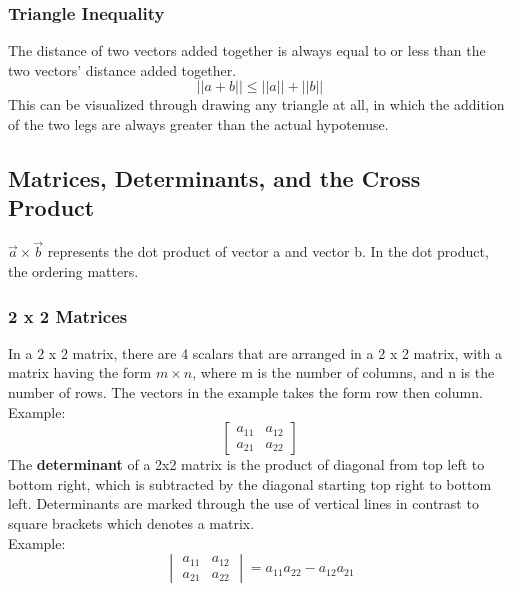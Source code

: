\documentclass{article}
\begin{document}
	\subsubsection{Triangle Inequality}
	The distance of two vectors added together is always equal to or less than the two vectors' distance added together.
	$$ ||a + b|| \leq ||a|| + ||b||$$
	This can be visualized through drawing any triangle at all, in which the addition of the two legs are always greater
	than the actual hypotenuse.

\subsection{Matrices, Determinants, and the Cross Product}
$\vec{a} \times \vec{b}$ represents the dot product of vector a and vector b. In the dot product, the ordering
matters.
    \subsubsection{2 x 2 Matrices}
        In a 2 x 2 matrix, there are 4 scalars that are arranged in a 2 x 2 matrix, with a matrix having the form 
        $m \times n$, where m is the number of columns, and n is the number of rows. The vectors in the example takes the form row then column.
        \\Example:
        $$ \begin{bmatrix}
          a_{11} & a_{12} \\
          a_{21} & a_{22}
          \end{bmatrix}
        $$
        The \textbf{determinant} of a 2x2 matrix is the product of diagonal from top left to bottom right, which is subtracted by the diagonal starting top right to bottom left. Determinants are marked through the use of vertical lines
        in contrast to square brackets which denotes a matrix.
        \\Example:
        $$\begin{vmatrix}
          a_{11} & a_{12} \\
          a_{21} & a_{22}
        \end{vmatrix} = a_{11} a_{22} - a_{12} a_{21}$$
\end{document}
